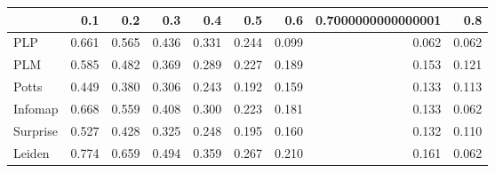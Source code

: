 \begin{tabular}{lrrrrrrrr}
\toprule
{} &   0.1 &   0.2 &   0.3 &   0.4 &   0.5 &   0.6 & 0.7000000000000001 &   0.8 \\
\midrule
PLP      & 0.661 & 0.565 & 0.436 & 0.331 & 0.244 & 0.099 &              0.062 & 0.062 \\
PLM      & 0.585 & 0.482 & 0.369 & 0.289 & 0.227 & 0.189 &              0.153 & 0.121 \\
Potts    & 0.449 & 0.380 & 0.306 & 0.243 & 0.192 & 0.159 &              0.133 & 0.113 \\
Infomap  & 0.668 & 0.559 & 0.408 & 0.300 & 0.223 & 0.181 &              0.133 & 0.062 \\
Surprise & 0.527 & 0.428 & 0.325 & 0.248 & 0.195 & 0.160 &              0.132 & 0.110 \\
Leiden   & 0.774 & 0.659 & 0.494 & 0.359 & 0.267 & 0.210 &              0.161 & 0.062 \\
\bottomrule
\end{tabular}
